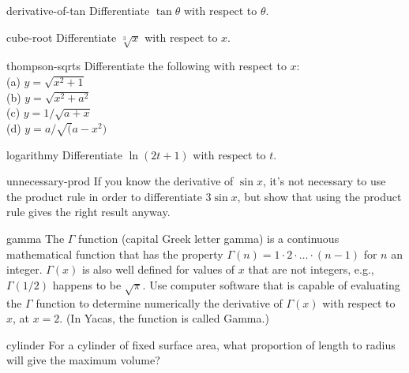 \begin{hwsection}
\begin{hwwithsoln}{derivative-of-tan}
Differentiate $\tan\theta$ with respect to $\theta$.
\end{hwwithsoln}

\begin{hwwithsoln}{cube-root}
Differentiate $\sqrt[3]{x}$ with respect to $x$.
\end{hwwithsoln}

\begin{hwwithsoln}{thompson-sqrts}
Differentiate the following with respect to $x$:\\
(a) $y=\sqrt{x^2+1}$ \\
(b) $y=\sqrt{x^2+a^2}$ \\
(c) $y=1/\sqrt{a+x}$ \\
(d) $y=a/\sqrt(a-x^2)$ \\
 \thompson
\end{hwwithsoln}

\begin{hwwithsoln}{logarithmy}
Differentiate $\ln(2t+1)$ with respect to $t$.
\end{hwwithsoln}

\begin{hwwithsoln}{unnecessary-prod}
If you know the derivative of $\sin x$, it's not necessary to use the product rule in order
to differentiate $3\sin x$, but show that using the product rule gives the right result anyway.
\end{hwwithsoln}

\begin{hwwithsoln}{gamma}
The $\Gamma$ function (capital Greek letter gamma) is a continuous mathematical function that
has the property $\Gamma(n)=1\cdot2\cdot\ldots\cdot(n-1)$ for $n$ an integer. $\Gamma(x)$ is also well
defined for values of $x$ that are not integers, e.g., $\Gamma(1/2)$ happens to be $\sqrt{\pi}$.
Use computer software that is capable of evaluating the $\Gamma$ function to determine numerically
the derivative of $\Gamma(x)$ with respect to $x$, at $x=2$. (In Yacas, the function is called Gamma.)
\end{hwwithsoln}

\begin{hwwithsoln}{cylinder}
For a cylinder of fixed surface area, what proportion of length to radius will give the maximum volume?
\end{hwwithsoln}


\end{hwsection}
